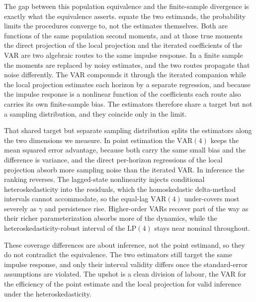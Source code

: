 The gap between this population equivalence and the finite-sample divergence is exactly what the
equivalence asserts. \textcite{plagborg2021local} equate the two estimands, the probability limits
the procedures converge to, not the estimates themselves. Both are functions of the same
population second moments, and at those true moments the direct projection of the local projection
and the iterated coefficients of the VAR are two algebraic routes to the same impulse response. In
a finite sample the moments are replaced by noisy estimates, and the two routes propagate that
noise differently. The VAR compounds it through the iterated companion while the local projection
estimates each horizon by a separate regression, and because the impulse response is a nonlinear
function of the coefficients each route also carries its own finite-sample bias. The estimators
therefore share a target but not a sampling distribution, and they coincide only in the limit.

That shared target but separate sampling distribution splits the estimators along the two
dimensions we measure. In point estimation the $\text{VAR}(4)$ keeps the mean squared error
advantage, because both carry the same small bias and the difference is variance, and the direct
per-horizon regressions of the local projection absorb more sampling noise than the iterated VAR.
In inference the ranking reverses. The lagged-state nonlinearity injects conditional
heteroskedasticity into the residuals, which the homoskedastic delta-method intervals cannot
accommodate, so the equal-lag $\text{VAR}(4)$ under-covers most severely as $\gamma$ and persistence
rise. Higher-order VARs recover part of the way as their richer parameterization absorbs more of the
dynamics, while the heteroskedasticity-robust interval of the $\text{LP}(4)$ stays near nominal
throughout.

These coverage differences are about inference, not the point estimand, so they do not contradict
the equivalence. The two estimators still target the same impulse response, and only their
interval validity differs once the standard-error assumptions are violated. The upshot is a clean
division of labour, the VAR for the efficiency of the point estimate and the local projection for
valid inference under the heteroskedasticity.

\FloatBarrier